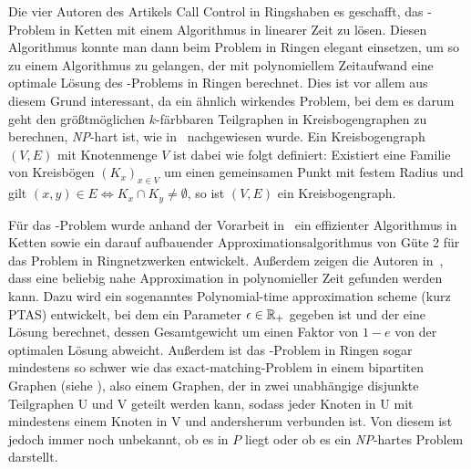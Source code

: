 Die vier Autoren des Artikels \glqq Call Control in Rings\grqq haben es geschafft, das \CallControl-Problem in Ketten mit
einem Algorithmus in linearer Zeit zu lösen.
Diesen Algorithmus konnte man dann beim Problem in Ringen elegant einsetzen, um so zu einem Algorithmus zu gelangen, der mit polynomiellem Zeitaufwand
eine optimale Lösung des \CallControl-Problems in Ringen berechnet.
Dies ist vor allem aus diesem Grund interessant, da ein ähnlich wirkendes Problem, bei dem es darum geht den größtmöglichen $k$-färbbaren 
Teilgraphen in Kreisbogengraphen zu berechnen, {\em NP}-hart ist, wie in~\cite{circular-arc} nachgewiesen wurde.
Ein Kreisbogengraph $(V,E)$ mit Knotenmenge $V$ ist dabei wie folgt definiert: 
Existiert eine Familie von Kreisbögen $(K_x)_{x\in V}$ um einen gemeinsamen Punkt mit festem Radius 
und gilt $(x,y)\in E \Leftrightarrow K_x \cap K_y \neq \emptyset$, so ist $(V,E)$ ein Kreisbogengraph.

Für das \WeightedCallControl-Problem wurde anhand der Vorarbeit in~\cite{carlisle} ein effizienter Algorithmus in Ketten sowie ein darauf
aufbauender Approximationsalgorithmus von Güte 2 für das Problem in Ringnetzwerken entwickelt.
Außerdem zeigen die Autoren in~\cite{paper}, dass eine beliebig nahe Approximation in polynomieller Zeit gefunden werden kann.
Dazu wird ein sogenanntes Polynomial-time approximation scheme (kurz PTAS) entwickelt, bei dem ein Parameter $\epsilon \in \mathbb R_+$ gegeben ist
und der eine Lösung berechnet, dessen Gesamtgewicht um einen Faktor von $1-e$ von der optimalen Lösung abweicht.
Außerdem ist das \WeightedCallControl-Problem in Ringen sogar mindestens so schwer wie das exact-matching-Problem in einem bipartiten Graphen (siehe \cite{hochbaum-levin}),
also einem Graphen, der in zwei unabhängige disjunkte Teilgraphen U und V geteilt werden kann, sodass jeder Knoten in U mit mindestens einem Knoten in V und andersherum verbunden ist.
Von diesem ist jedoch immer noch unbekannt, ob es in $P$ liegt oder ob es ein {\em NP}-hartes Problem darstellt.